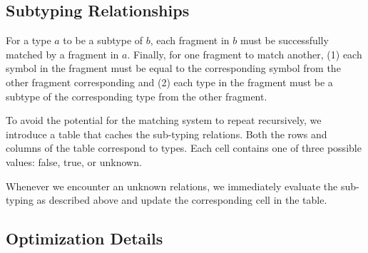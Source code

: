 \subsection{Subtyping Relationships}
\label{ssec:subtyping-relationships}

For a type $a$ to be a subtype of $b$, each fragment in $b$ must be successfully matched by a fragment in $a$. Finally, for one fragment to match another, (1) each symbol in the fragment must be equal to the corresponding symbol from the other fragment corresponding and (2) each type in the fragment must be a subtype of the corresponding type from the other fragment. 

To avoid the potential for the matching system to repeat recursively, we introduce a table that caches the sub-typing relations. Both the rows and columns of the table correspond to types. Each cell contains one of three possible values: false, true, or unknown. 

Whenever we encounter an unknown relations, we immediately evaluate the sub-typing as described above and update the corresponding cell in the table.

\subsection{Optimization Details}
\label{ssec:optimization-details}

